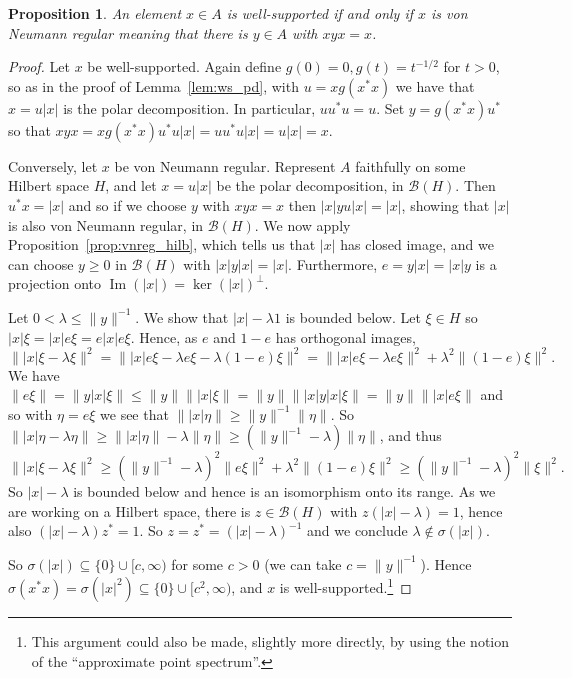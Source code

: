 \documentclass[twoside,a4paper,12pt]{article}
\theoremstyle{plain}
\newtheorem{proposition}{Proposition}[section]
\theoremstyle{definition}
\newcommand{\mc}{\mathcal}
\newcommand{\im}{\operatorname{Im}}
\begin{document}
\begin{proposition}\label{prop:ws_vnreg}
An element $x\in A$ is well-supported if and only if $x$ is \emph{von Neumann regular} meaning that there is $y\in A$ with $xyx=x$.
\end{proposition}
\begin{proof}
Let $x$ be well-supported.  Again define $g(0)=0, g(t)=t^{-1/2}$ for $t>0$, so as in the proof of Lemma~\ref{lem:ws_pd}, with $u = xg(x^*x)$ we have that $x = u|x|$ is the polar decomposition.  In particular, $uu^*u = u$.  Set $y = g(x^*x) u^*$ so that $xyx = x g(x^*x) u^* u |x| = u u^* u |x| = u |x| = x$.

Conversely, let $x$ be von Neumann regular.  Represent $A$ faithfully on some Hilbert space $H$, and let $x = u|x|$ be the polar decomposition, in $\mc B(H)$.  Then $u^*x = |x|$ and so if we choose $y$ with $xyx = x$ then $|x| yu |x| = |x|$, showing that $|x|$ is also von Neumann regular, in $\mc B(H)$.  We now apply Proposition~\ref{prop:vnreg_hilb}, which tells us that $|x|$ has closed image, and we can choose $y \geq 0$ in $\mc B(H)$ with $|x| y |x| = |x|$.  Furthermore, $e = y|x| =  |x|y$ is a projection onto $\im(|x|) = \ker(|x|)^\perp$.

Let $0 < \lambda \leq \|y\|^{-1}$.  We show that $|x|-\lambda 1$ is bounded below.  Let $\xi\in H$ so $|x|\xi = |x|e \xi = e|x|e\xi$.  Hence, as $e$ and $1-e$ has orthogonal images,
\[ \| |x|\xi - \lambda\xi\|^2
= \| |x|e\xi - \lambda e\xi - \lambda (1-e)\xi \|^2
= \| |x|e\xi - \lambda e\xi\|^2 + \lambda^2 \| (1-e)\xi \|^2. \]
We have $\|e\xi\| = \|y|x|\xi\| \leq \|y\| \| |x|\xi\| = \|y\| \| |x| y|x| \xi\| = \|y\| \| |x| e \xi \|$ and so with $\eta=e\xi$ we see that $\| |x|\eta\| \geq \|y\|^{-1} \|\eta\|$.  So $\| |x| \eta - \lambda\eta\| \geq \| |x|\eta\| - \lambda \|\eta\| \geq (\|y\|^{-1} - \lambda) \|\eta\|$, and thus
\[ \| |x|\xi - \lambda\xi\|^2 \geq (\|y\|^{-1} - \lambda)^2 \|e\xi\|^2 + \lambda^2 \|(1-e)\xi\|^2
\geq (\|y\|^{-1}-\lambda)^2 \|\xi\|^2. \]
So $|x|-\lambda$ is bounded below and hence is an isomorphism onto its range.  As we are working on a Hilbert space, there is $z\in\mc B(H)$ with $z(|x|-\lambda) = 1$, hence also $(|x|-\lambda)z^*=1$.  So $z = z^* = (|x|-\lambda)^{-1}$ and we conclude $\lambda\not\in\sigma(|x|)$.

So $\sigma(|x|) \subseteq \{0\} \cup [c,\infty)$ for some $c>0$ (we can take $c = \|y\|^{-1}$).  Hence $\sigma(x^*x) = \sigma(|x|^2) \subseteq \{0\} \cup [c^2,\infty)$, and $x$ is well-supported.\footnote{This argument could also be made, slightly more directly, by using the notion of the ``approximate point spectrum''.}
\end{proof}
\end{document}
